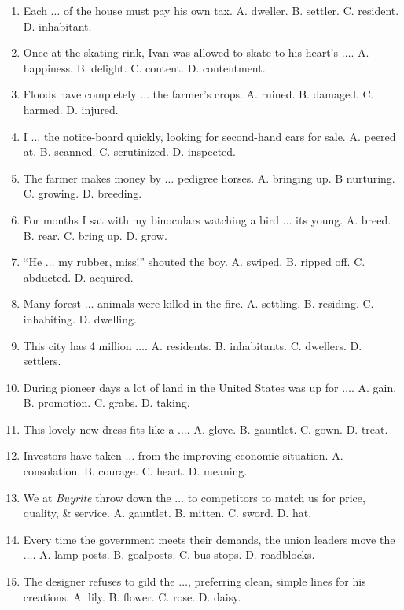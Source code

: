 \documentclass{article}
\numberwithin{equation}{section}
\begin{document}
\begin{enumerate}[leftmargin=2mm]
	\item Each $\ldots$ of the house must pay his own tax. {\sf A.} dweller. {\sf B.} settler. {\sf C.} resident. {\sf D.} inhabitant.
	\item Once at the skating rink, Ivan was allowed to skate to his heart's $\ldots$. {\sf A.} happiness. {\sf B.} delight. {\sf C.} content. {\sf D.} contentment.
	\item Floods have completely $\ldots$ the farmer's crops. {\sf A.} ruined. {\sf B.} damaged. {\sf C.} harmed. {\sf D.} injured.
	\item I $\ldots$ the notice-board quickly, looking for second-hand cars for sale. {\sf A.} peered at. {\sf B.} scanned. {\sf C.} scrutinized. {\sf D.} inspected.
	\item The farmer makes money by $\ldots$ pedigree horses. {\sf A.} bringing up. B nurturing. {\sf C.} growing. {\sf D.} breeding.
	\item For months I sat with my binoculars watching a bird $\ldots$ its young. {\sf A.} breed. {\sf B.} rear. {\sf C.} bring up. {\sf D.} grow.
	\item ``He $\ldots$ my rubber, miss!'' shouted the boy. {\sf A.} swiped. {\sf B.} ripped off. {\sf C.} abducted. {\sf D.} acquired.
	\item Many forest-$\ldots$ animals were killed in the fire. {\sf A.} settling. {\sf B.} residing. {\sf C.} inhabiting. {\sf D.} dwelling.
	\item This city has 4 million $\ldots$. {\sf A.} residents. {\sf B.} inhabitants. {\sf C.} dwellers. {\sf D.} settlers.
	\item During pioneer days a lot of land in the United States was up for $\ldots$. {\sf A.} gain. {\sf B.} promotion. {\sf C.} grabs. {\sf D.} taking.
	\item This lovely new dress fits like a $\ldots$. {\sf A.} glove. {\sf B.} gauntlet. {\sf C.} gown. {\sf D.} treat.
	\item Investors have taken $\ldots$ from the improving economic situation. {\sf A.} consolation. {\sf B.} courage. {\sf C.} heart. {\sf D.} meaning.
	\item We at \textit{Buyrite} throw down the $\ldots$ to competitors to match us for price, quality, \& service. {\sf A.} gauntlet. {\sf B.} mitten. {\sf C.} sword. {\sf D.} hat.
	\item Every time the government meets their demands, the union leaders move the $\ldots$. {\sf A.} lamp-posts. {\sf B.} goalposts. {\sf C.} bus stops. {\sf D.} roadblocks.
	\item The designer refuses to gild the $\ldots$, preferring clean, simple lines for his creations. {\sf A.} lily. {\sf B.} flower. {\sf C.} rose. {\sf D.} daisy.

\end{enumerate}
\end{document}
